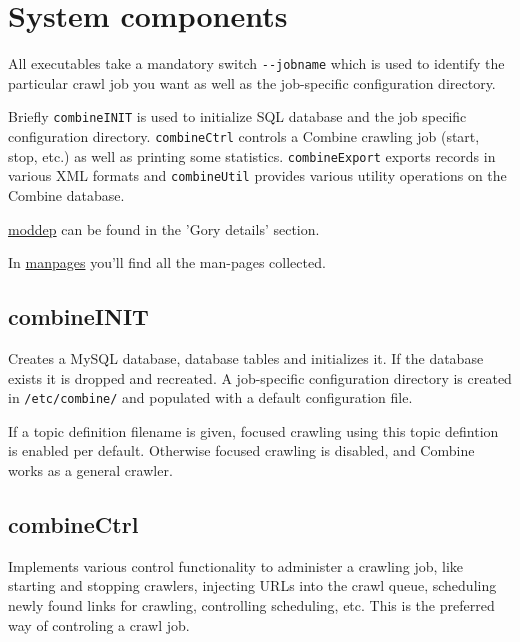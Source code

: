 \section{System components}
\label{comp}
All executables take a mandatory switch \verb+--jobname+ which is used
to identify the particular crawl job you want as well as the
job-specific configuration directory.

Briefly {\tt combineINIT} is used to initialize SQL database and the
job specific configuration directory. {\tt combineCtrl} controls a Combine crawling job (start, stop, etc.) as well as printing some statistics. {\tt combineExport} exports records in various XML formats and 
{\tt combineUtil} provides various utility operations on the Combine database.

\hyperref{Detailed dependency information}{Detailed dependency 
information (section }{)}{moddep} can be found in the 'Gory
details' section.

In \hyperref{appendix}{appendix (}{)}{manpages} you'll find all
the man-pages collected.

\subsection{combineINIT}
Creates a MySQL database, database tables and initializes it. If the database exists it is dropped and recreated. A job-specific configuration directory is created in {\tt /etc/combine/} and populated with a default configuration file.

If a topic definition filename is given, focused crawling using this topic defintion is enabled per default. Otherwise focused crawling is disabled, and Combine works as a general crawler.

\subsection{combineCtrl}

Implements various control functionality to administer a crawling job, like starting and stopping crawlers, injecting URLs into the crawl queue, scheduling newly found links for crawling, controlling scheduling, etc.
This is the preferred way of controling a crawl job.

